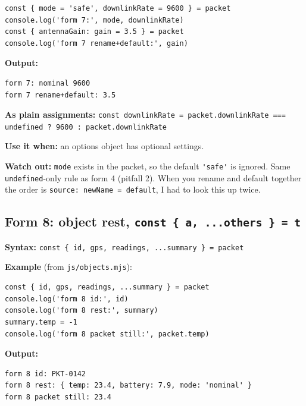 \begin{lstlisting}
const { mode = 'safe', downlinkRate = 9600 } = packet
console.log('form 7:', mode, downlinkRate)
const { antennaGain: gain = 3.5 } = packet
console.log('form 7 rename+default:', gain)
\end{lstlisting}

\textbf{Output:}

\begin{lstlisting}
form 7: nominal 9600
form 7 rename+default: 3.5
\end{lstlisting}

\textbf{As plain assignments:} \passthrough{\lstinline!const downlinkRate = packet.downlinkRate === undefined ? 9600 : packet.downlinkRate!}

\textbf{Use it when:} an options object has optional settings.

\textbf{Watch out:} \passthrough{\lstinline!mode!} exists in the packet, so the default \passthrough{\lstinline!'safe'!} is ignored. Same \passthrough{\lstinline!undefined!}-only rule as form 4 (pitfall 2). When you rename and default together the order is \passthrough{\lstinline!source: newName = default!}, I had to look this up twice.

\hypertarget{form-8-object-rest-const--a-others---t}{%
\subsection{\texorpdfstring{Form 8: object rest, \texttt{const\ \{\ a,\ ...others\ \}\ =\ t}}{Form 8: object rest, const \{ a, ...others \} = t}}\label{form-8-object-rest-const--a-others---t}}

\textbf{Syntax:} \passthrough{\lstinline!const \{ id, gps, readings, ...summary \} = packet!}

\textbf{Example} (from \passthrough{\lstinline!js/objects.mjs!}):

\begin{lstlisting}
const { id, gps, readings, ...summary } = packet
console.log('form 8 id:', id)
console.log('form 8 rest:', summary)
summary.temp = -1
console.log('form 8 packet still:', packet.temp)
\end{lstlisting}

\textbf{Output:}

\begin{lstlisting}
form 8 id: PKT-0142
form 8 rest: { temp: 23.4, battery: 7.9, mode: 'nominal' }
form 8 packet still: 23.4
\end{lstlisting}

